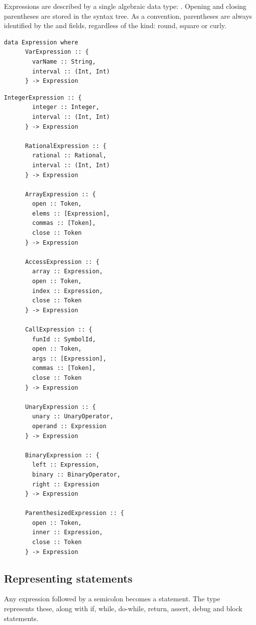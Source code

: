 \documentclass[UdineBachThesis,american,11pt,draft]{PhdThesis}
\begin{document}
  Expressions are described by a single algebraic data type:
  \lstinline@Expression@. Opening and closing parentheses are stored in the
  syntax tree. As a convention, parentheses are always identified by the
  \lstinline@open@ and \lstinline@close@ fields, regardless of the kind:
  round, square or curly.

  \begin{lstlisting}[gobble=4,basicstyle=\ttfamily\small]
    data Expression where
      VarExpression :: {
        varName :: String,
        interval :: (Int, Int)
      } -> Expression
  \end{lstlisting}

  \begin{lstlisting}[gobble=4,basicstyle=\ttfamily\small]
      IntegerExpression :: {
        integer :: Integer,
        interval :: (Int, Int)
      } -> Expression

      RationalExpression :: {
        rational :: Rational,
        interval :: (Int, Int)
      } -> Expression

      ArrayExpression :: {
        open :: Token,
        elems :: [Expression],
        commas :: [Token],
        close :: Token
      } -> Expression

      AccessExpression :: {
        array :: Expression,
        open :: Token,
        index :: Expression,
        close :: Token
      } -> Expression

      CallExpression :: {
        funId :: SymbolId,
        open :: Token,
        args :: [Expression],
        commas :: [Token],
        close :: Token
      } -> Expression

      UnaryExpression :: {
        unary :: UnaryOperator,
        operand :: Expression
      } -> Expression

      BinaryExpression :: {
        left :: Expression,
        binary :: BinaryOperator,
        right :: Expression
      } -> Expression

      ParenthesizedExpression :: {
        open :: Token,
        inner :: Expression,
        close :: Token
      } -> Expression
  \end{lstlisting}

  \subsection{Representing statements}

  Any expression followed by a semicolon becomes a statement. The type
  \lstinline@Statement@ represents these, along with if, while, do-while,
  return, assert, debug and block statements.
\end{document}
